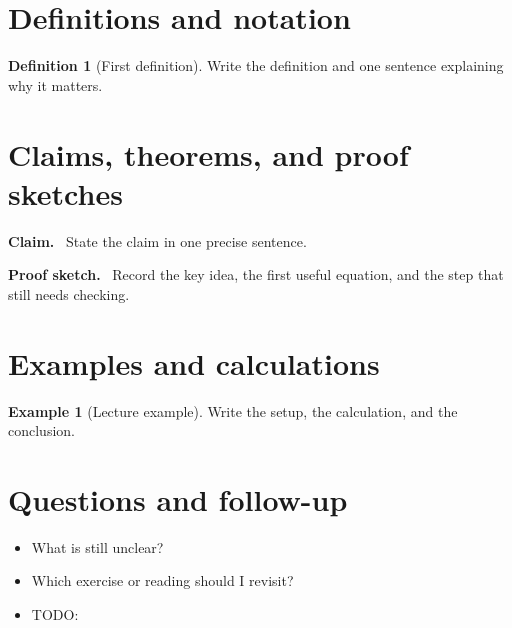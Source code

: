 \documentclass[11pt]{article}
\newcommand{\1}{\mathbf{1}}
\theoremstyle{notestyle}
\theoremstyle{definition}
\newtheorem{definition}[theorem]{Definition}
\newtheorem{example}[theorem]{Example}
\newenvironment{claim}{\par\noindent\textbf{Claim.}\ }{\par}
\newenvironment{proofsketch}{\par\noindent\textbf{Proof sketch.}\ }{\par}
\begin{document}
\section{Definitions and notation}

\begin{definition}[First definition]
Write the definition and one sentence explaining why it matters.
\end{definition}

\section{Claims, theorems, and proof sketches}

\begin{claim}
State the claim in one precise sentence.
\end{claim}

\begin{proofsketch}
Record the key idea, the first useful equation, and the step that still needs checking.
\end{proofsketch}

\section{Examples and calculations}

\begin{example}[Lecture example]
Write the setup, the calculation, and the conclusion.
\end{example}

\section{Questions and follow-up}

\begin{itemize}
\item What is still unclear?
\item Which exercise or reading should I revisit?
\item TODO:
\end{itemize}
\end{document}
